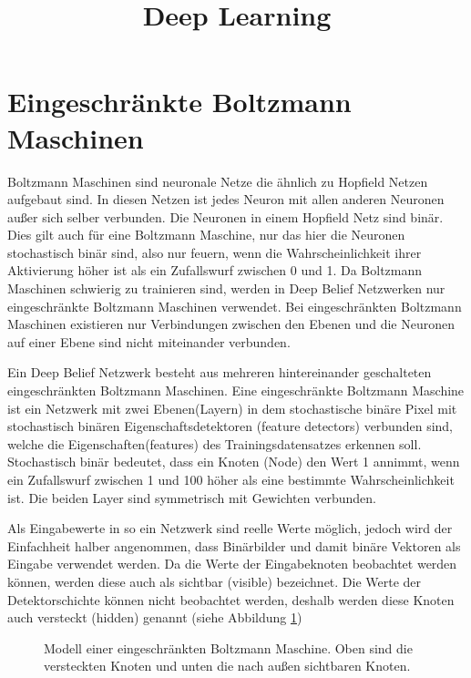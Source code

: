 \documentclass[12pt]{article}
\title{Deep Learning}
\begin{document}
	\maketitle

	\newpage

	\tableofcontents
	
	\newpage
	\section{Eingeschränkte Boltzmann Maschinen}
	Boltzmann Maschinen sind neuronale Netze die ähnlich zu Hopfield Netzen aufgebaut sind. In diesen Netzen ist jedes Neuron mit allen anderen Neuronen außer sich selber verbunden. Die Neuronen in einem Hopfield Netz sind binär. Dies gilt auch für eine Boltzmann Maschine, nur das hier die Neuronen stochastisch binär sind, also nur feuern, wenn die Wahrscheinlichkeit ihrer Aktivierung höher ist als ein Zufallswurf zwischen 0 und 1. Da Boltzmann Maschinen schwierig zu trainieren sind, werden in Deep Belief Netzwerken nur eingeschränkte Boltzmann Maschinen verwendet. Bei eingeschränkten Boltzmann Maschinen existieren nur Verbindungen zwischen den Ebenen und die Neuronen auf einer Ebene sind nicht miteinander verbunden.
	
	Ein Deep Belief Netzwerk besteht aus mehreren hintereinander geschalteten eingeschränkten Boltzmann Maschinen. Eine eingeschränkte Boltzmann Maschine ist ein Netzwerk mit zwei Ebenen(Layern) in dem stochastische binäre Pixel mit stochastisch binären Eigenschaftsdetektoren (feature detectors) verbunden sind, welche die Eigenschaften(features) des Trainingsdatensatzes erkennen soll. Stochastisch binär bedeutet, dass ein Knoten (Node) den Wert 1 annimmt, wenn ein Zufallswurf zwischen 1 und 100 höher als eine bestimmte Wahrscheinlichkeit ist. Die beiden Layer sind symmetrisch mit Gewichten verbunden.
	


Als Eingabewerte in so ein Netzwerk sind reelle Werte möglich, jedoch wird der Einfachheit halber angenommen, dass Binärbilder und damit binäre Vektoren als Eingabe verwendet werden. Da die Werte der Eingabeknoten beobachtet werden können, werden diese auch als sichtbar (visible) bezeichnet. Die Werte der Detektorschichte können nicht beobachtet werden, deshalb werden diese Knoten auch versteckt (hidden) genannt (siehe Abbildung \ref{Boltzmann})

\begin{figure}[H]
	
	\caption{Modell einer eingeschränkten Boltzmann Maschine. Oben sind die versteckten Knoten und unten die nach außen sichtbaren Knoten.}
	\label{Boltzmann}
	\end{figure}
\end{document}

